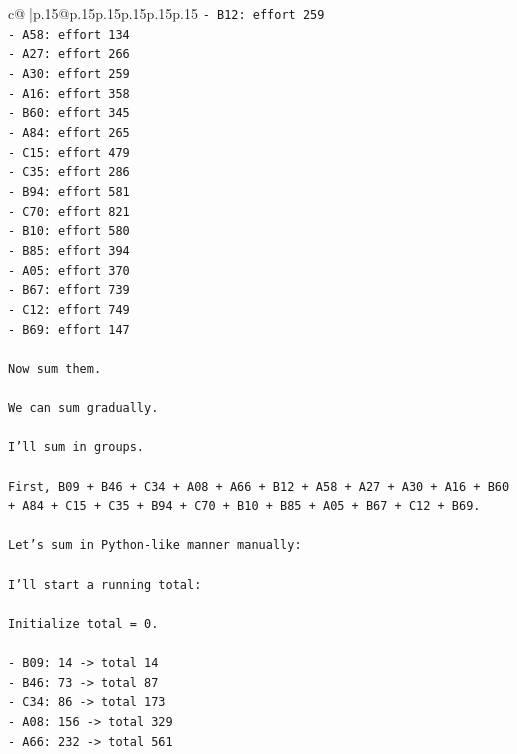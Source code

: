 \documentclass{article}
\begin{document}
{\begin{supertabular}{c@{$\;$}|p{.15\linewidth}@{}p{.15\linewidth}p{.15\linewidth}p{.15\linewidth}p{.15\linewidth}p{.15\linewidth}}
{{{\texttt{{-} B12: effort 259} \\
\texttt{{-} A58: effort 134} \\
\texttt{{-} A27: effort 266} \\
\texttt{{-} A30: effort 259} \\
\texttt{{-} A16: effort 358} \\
\texttt{{-} B60: effort 345} \\
\texttt{{-} A84: effort 265} \\
\texttt{{-} C15: effort 479} \\
\texttt{{-} C35: effort 286} \\
\texttt{{-} B94: effort 581} \\
\texttt{{-} C70: effort 821} \\
\texttt{{-} B10: effort 580} \\
\texttt{{-} B85: effort 394} \\
\texttt{{-} A05: effort 370} \\
\texttt{{-} B67: effort 739} \\
\texttt{{-} C12: effort 749} \\
\texttt{{-} B69: effort 147} \\
\\ 
\texttt{Now sum them.} \\
\\ 
\texttt{We can sum gradually.} \\
\\ 
\texttt{I'll sum in groups.} \\
\\ 
\texttt{First, B09 + B46 + C34 + A08 + A66 + B12 + A58 + A27 + A30 + A16 + B60 + A84 + C15 + C35 + B94 + C70 + B10 + B85 + A05 + B67 + C12 + B69.} \\
\\ 
\texttt{Let's sum in Python{-}like manner manually:} \\
\\ 
\texttt{I'll start a running total:} \\
\\ 
\texttt{Initialize total = 0.} \\
\\ 
\texttt{{-} B09: 14 {-}> total 14} \\
\texttt{{-} B46: 73 {-}> total 87} \\
\texttt{{-} C34: 86 {-}> total 173} \\
\texttt{{-} A08: 156 {-}> total 329} \\
\texttt{{-} A66: 232 {-}> total 561} \\
}}}
\end{supertabular}}
\end{document}

